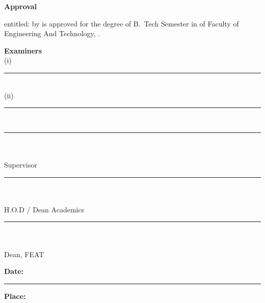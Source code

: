 \thispagestyle{empty}
\vspace*{0.2cm}
\begin{center}
{\fontsize{22}{28}\selectfont\bfseries \ProjectLabel{} Approval\par}
\end{center}
\vspace{1.0cm}
{
\noindent\ProjectLabel{} entitled: \textbf{\ProjectTitle} by \textbf{\StudentName} is approved for the degree of B.\ Tech Semester \Semester{} in \textbf{\DepartmentName} of Faculty of Engineering And Technology, \PlaceName.\par}

\vspace{1.0cm}
\hspace*{2.7in}\begin{minipage}[t]{3.05in}
\raggedright
\textbf{Examiners}\\[1.1cm]
(i) \rule{5.6cm}{0.4pt}\\[1.1cm]
(ii) \rule{5.6cm}{0.4pt}\\[1.5cm]
\rule{7cm}{0.4pt}\\
\textbf{\SupervisorName}\\
Supervisor\\[1.1cm]
\rule{7cm}{0.4pt}\\
\textbf{\HODName}\\
H.O.D / Dean Academics\\[1.1cm]
\rule{7cm}{0.4pt}\\
\textbf{\DeanName}\\
Dean, FEAT
\end{minipage}

\vspace{0.8cm}
{
\noindent\textbf{Date:} \rule{4cm}{0.4pt}\par
\vspace{0.4cm}
\noindent\textbf{Place:} \PlaceName\par}
\clearpage
